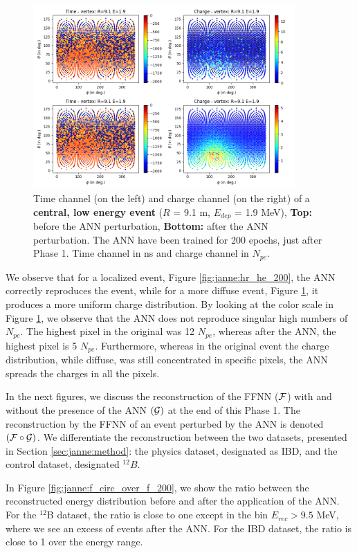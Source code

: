\documentclass[../main.tex]{subfiles}
\begin{document}
\begin{figure}[!ht]
  \centering
  \includegraphics[height=7cm]{images/janne/events/lr_le_200.png}
  \caption{Time channel (on the left) and charge channel (on the right) of a \textbf{central, low energy event} ($R$ = 9.1 m, $E_{dep}$ = 1.9 MeV), \textbf{Top:} before the ANN perturbation, \textbf{Bottom:} after the ANN perturbation. The ANN have been trained for 200 epochs, just after Phase 1. Time channel in ns and charge channel in $N_{pe}$.}
  \label{fig:janne:lr_le_200}
\end{figure}

We observe that for a localized event, Figure \ref{fig:janne:hr_he_200}, the ANN correctly reproduces the event, while for a more diffuse event, Figure \ref{fig:janne:lr_le_200}, it produces a more uniform charge distribution. By looking at the color scale in Figure \ref{fig:janne:lr_le_200}, we observe that the ANN does not reproduce singular high numbers of $N_{pe}$. The highest pixel in the original was 12 $N_{pe}$, whereas after the ANN, the highest pixel is 5 $N_{pe}$. Furthermore, whereas in the original event the charge distribution, while diffuse, was still concentrated in specific pixels, the ANN spreads the charges in all the pixels.

In the next figures, we discuss the reconstruction of the FFNN (${\cal F}$) with and without the presence of the ANN $({\cal G})$ at the end of this Phase 1. The reconstruction by the FFNN of an event perturbed by the ANN is denoted $({\cal F} \circ {\cal G})$. We differentiate the reconstruction between the two datasets, presented in Section \ref{sec:janne:method}: the physics dataset, designated as IBD, and the control dataset, designated $^{12}B$.

In Figure \ref{fig:janne:f_circ_over_f_200}, we show the ratio between the reconstructed energy distribution before and after the application of the ANN. For the $^{12}$B dataset, the ratio is close to one except in the bin $E_{rec} > 9.5$ MeV, where we see an excess of events after the ANN. For the IBD dataset, the ratio is close to 1 over the energy range.
\end{document}
